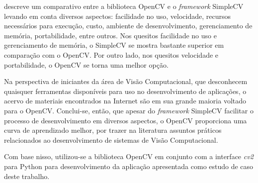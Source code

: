  descreve um comparativo entre a biblioteca OpenCV e o \textit{framework} SimpleCV levando em conta diversos aspectos: facilidade no uso, velocidade, recursos necessários para execução, custo, ambiente de desenvolvimento, gerenciamento de memória, portabilidade, entre outros. Nos quesitos facilidade no uso e gerenciamento de memória, o SimpleCV se mostra bastante superior em comparação com o OpenCV. Por outro lado, nos quesitos velocidade e portabilidade, o OpenCV se torna uma melhor opção.

Na perspectiva de iniciantes da área de Visão Computacional, que desconhecem quaisquer ferramentas disponíveis para uso no desenvolvimento de aplicações, o acervo de materiais encontrados na Internet são em sua grande maioria voltado para o OpenCV. Conclui-se, então, que apesar do \textit{framework} SimpleCV facilitar o processo de desenvolvimento em diversos aspectos, o OpenCV proporciona uma curva de aprendizado melhor, por trazer na literatura assuntos práticos relacionados ao desenvolvimento de sistemas de Visão Computacional.

Com base nisso, utilizou-se a biblioteca OpenCV em conjunto com a interface \textit{cv2} para Python para desenvolvimento da aplicação apresentada como estudo de caso deste trabalho.
